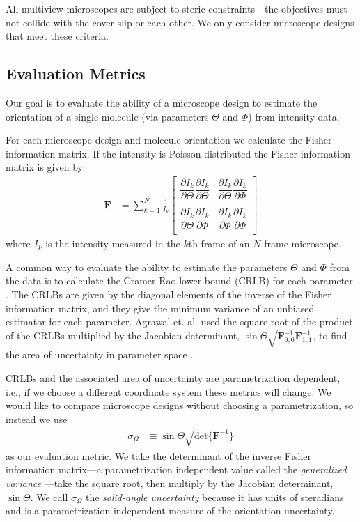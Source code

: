 \documentclass[10pt]{article}
\providecommand{\mb}[1]{\mathbf{#1}}
\begin{document}
All multiview microscopes are subject to steric constraints---the objectives
must not collide with the cover slip or each other. We only consider microscope
designs that meet these criteria.

\subsection{Evaluation Metrics}\label{metrics}
Our goal is to evaluate the ability of a microscope design to estimate the
orientation of a single molecule (via parameters $\Theta$ and $\Phi$) from
intensity data.

For each microscope design and molecule orientation we calculate the Fisher
information matrix. If the intensity is Poisson distributed the
Fisher information matrix is given by
\begin{align}
  \mb{F} &= \sum_{k=1}^N \frac{1}{I_k}
  \begin{bmatrix}
    \dfrac{\partial I_k}{\partial \Theta}\dfrac{\partial I_k}{\partial \Theta}&\dfrac{\partial I_k}{\partial \Theta}\dfrac{\partial I_k}{\partial \Phi}\\\\
    \dfrac{\partial I_k}{\partial \Theta}\dfrac{\partial I_k}{\partial \Phi}&\dfrac{\partial I_k}{\partial \Phi}\dfrac{\partial I_k}{\partial \Phi}\\    
  \end{bmatrix}
\end{align}
where $I_k$ is the intensity measured in the $k$th frame of an $N$ frame
microscope.

A common way to evaluate the ability to estimate the parameters $\Theta$ and
$\Phi$ from the data is to calculate the Cramer-Rao lower bound (CRLB) for each
parameter \cite{kay1993}. The CRLBs are given by the diagonal elements of the
inverse of the Fisher information matrix, and they give the minimum variance of
an unbiased estimator for each parameter. Agrawal et. al. used the square root
of the product of the CRLBs multiplied by the Jacobian determinant,
$\sin\Theta\sqrt{\mb{F}^{-1}_{0,0}\mb{F}^{-1}_{1,1}}$, to find the area of
uncertainty in parameter space \cite{agrawal2012}.

CRLBs and the associated area of uncertainty are parametrization dependent,
i.e., if we choose a different coordinate system these metrics will change. We
would like to compare microscope designs without choosing a parametrization, so
instead we use
\begin{align}
  \sigma_{\Omega} &\equiv \sin\Theta\sqrt{\text{det}\{\mb{F}^{-1}\}}
\end{align}
as our evaluation metric. We take the determinant of the inverse Fisher
information matrix---a parametrization independent value called the
\emph{generalized variance} \cite{anderson1958}---take the square root, then
multiply by the Jacobian determinant, $\sin\Theta$. We call $\sigma_{\Omega}$
the \emph{solid-angle uncertainty} because it has units of steradians and is a
parametrization independent measure of the orientation uncertainty.
\end{document}
